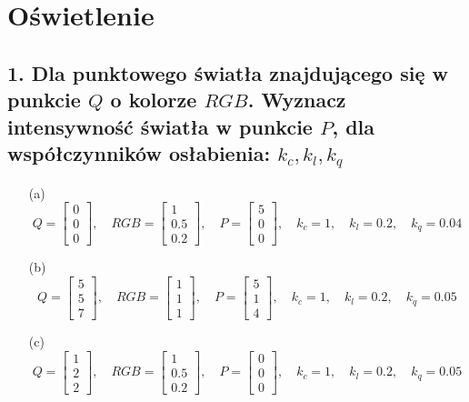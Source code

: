 \section*{Oświetlenie}

\subsection*{1. Dla punktowego światła znajdującego się w punkcie \( Q \) o kolorze \( RGB \). 
Wyznacz intensywność światła w punkcie \( P \), dla współczynników osłabienia: \( k_c, k_l, k_q \)}

\begin{enumerate}
    \item[(a)] 
    \[
    Q = \begin{bmatrix} 0 \\ 0 \\ 0 \end{bmatrix}, 
    \quad RGB = \begin{bmatrix} 1 \\ 0.5 \\ 0.2 \end{bmatrix}, 
    \quad P = \begin{bmatrix} 5 \\ 0 \\ 0 \end{bmatrix}, 
    \quad k_c = 1, \quad k_l = 0.2, \quad k_q = 0.04
    \]

    \item[(b)] 
    \[
    Q = \begin{bmatrix} 5 \\ 5 \\ 7 \end{bmatrix}, 
    \quad RGB = \begin{bmatrix} 1 \\ 1 \\ 1 \end{bmatrix}, 
    \quad P = \begin{bmatrix} 5 \\ 1 \\ 4 \end{bmatrix}, 
    \quad k_c = 1, \quad k_l = 0.2, \quad k_q = 0.05
    \]

    \item[(c)] 
    \[
    Q = \begin{bmatrix} 1 \\ 2 \\ 2 \end{bmatrix}, 
    \quad RGB = \begin{bmatrix} 1 \\ 0.5 \\ 0.2 \end{bmatrix}, 
    \quad P = \begin{bmatrix} 0 \\ 0 \\ 0 \end{bmatrix}, 
    \quad k_c = 1, \quad k_l = 0.2, \quad k_q = 0.05
    \]


\end{enumerate}
